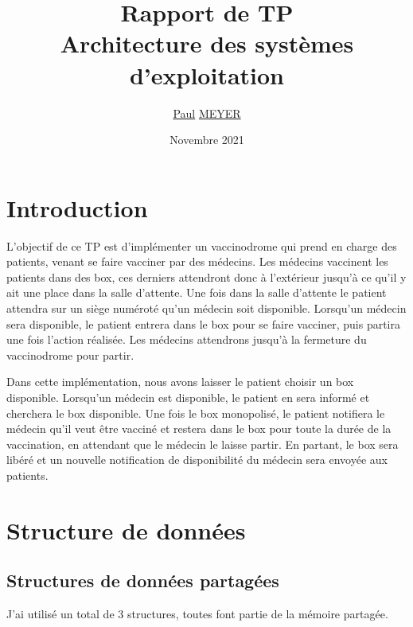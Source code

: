 \documentclass[a4paper]{article}
\title{Rapport de TP \\ Architecture des systèmes d'exploitation}
\author{\underline{Paul} \underline{MEYER}}
\date{Novembre 2021}
\makeatletter
\newenvironment{expl}{%
  \begin{list}{}{%
      \small\itshape%
      \topsep\z@%
      \listparindent0pt%
      \parsep0.75\baselineskip%
      \setlength{\leftmargin}{20mm}%
      \setlength{\rightmargin}{20mm}%
    }
  \item[]}%
  {\end{list}}
\makeatother
\begin{document}
\maketitle

\tableofcontents

\listoffigures

\newpage

\section{Introduction}

L'objectif de ce TP est d'implémenter un vaccinodrome qui prend en charge des patients, venant se faire vacciner par des médecins. Les médecins vaccinent les patients dans des box, ces derniers attendront donc à l'extérieur jusqu'à
ce qu'il y ait une place dans la salle d'attente. Une fois dans la salle d'attente le patient attendra sur un siège numéroté qu'un médecin soit disponible. Lorsqu'un médecin sera disponible, le patient entrera dans le box pour se faire vacciner, puis partira une fois l'action réalisée. Les médecins attendrons jusqu'à la fermeture du vaccinodrome pour partir.

Dans cette implémentation, nous avons laisser le patient choisir un box disponible.
Lorsqu'un médecin est disponible, le patient en sera informé et cherchera le box disponible.
Une fois le box monopolisé, le patient notifiera le médecin qu'il veut être vacciné et restera dans le box pour toute la durée de la vaccination, en attendant que le médecin le laisse partir. En partant, le box sera libéré et un nouvelle notification de disponibilité du médecin sera envoyée aux patients.
\newpage
\section{Structure de données}

\subsection{Structures de données partagées}\label{sec-shm}

  J'ai utilisé un total de 3 structures, toutes font partie de la mémoire partagée.
\end{document}
